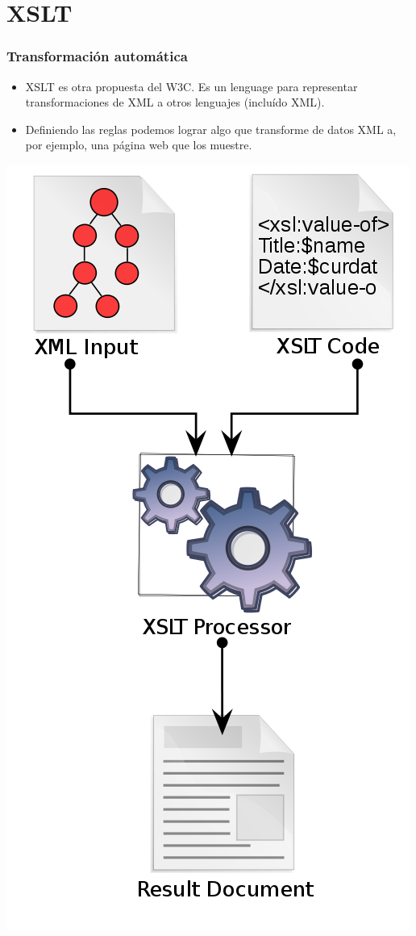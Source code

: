 \section{XSLT}

\begin{frame}
\frametitle{Transformación automática}
\begin{itemize}
\item	XSLT es otra propuesta del W3C. Es un lenguage para
	representar transformaciones de XML a otros lenguajes
	(incluído XML).
	\pause

\item	Definiendo las reglas podemos lograr algo que transforme
	de datos XML a, por ejemplo, una página web que los muestre.
\end{itemize}
\end{frame}

\begin{frame}
\centering
\includegraphics[scale=0.25]{xslt}
\end{frame}

